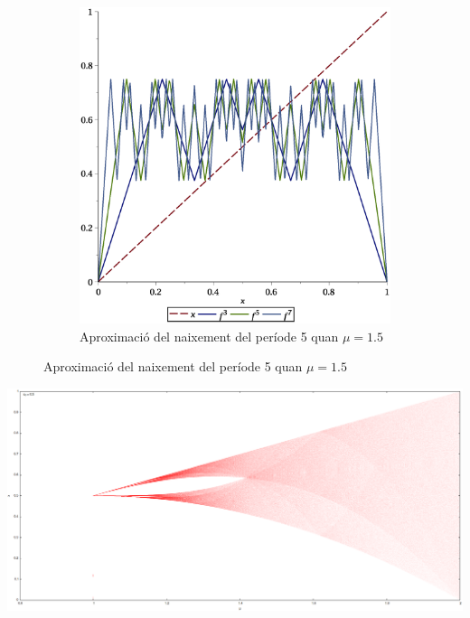 \documentclass[a4paper]{article}
\theoremstyle{definition}
\begin{document}
\begin{figure}[ht]
\begin{subfigure}[ht]{0.45\linewidth}
    \includegraphics[width=\linewidth]{Images/map55.eps}
    \caption{Aproximació del naixement del període 5 quan $\mu = 1.5$}
  \end{subfigure}
\end{figure}
\begin{center}
  \begin{minipage}{\linewidth}
    \centering
    \includegraphics[width=0.8\linewidth]{Images/map5.png}
  \end{minipage}
\end{center}
\end{document}

